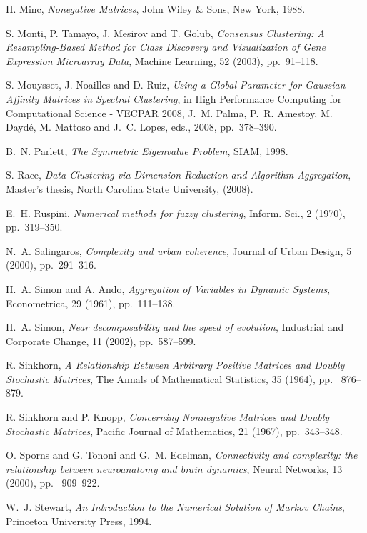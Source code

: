 \documentclass[final]{siamltex}
\begin{document}
\begin{thebibliography}{99}
 {\sc H. Minc}, {\em Nonegative Matrices}, John Wiley \& Sons, New York, 1988.

 {\sc S. Monti, P. Tamayo, J. Mesirov and T. Golub}, {\em Consensus Clustering: A Resampling-Based Method for Class Discovery and Visualization of Gene Expression Microarray Data}, Machine Learning, 52 (2003), pp.~91--118.

 {\sc S. Mouysset, J. Noailles and D. Ruiz}, {\em Using a Global Parameter for Gaussian Affinity Matrices in Spectral Clustering}, in High Performance Computing for Computational Science - VECPAR 2008, J.~M. Palma, P.~R. Amestoy, M. Dayd\'{e}, M. Mattoso and J.~C. Lopes, eds., 2008, pp.~378--390.

 {\sc B.~N. Parlett}, {\em The Symmetric Eigenvalue Problem}, SIAM, 1998.

 {\sc S. Race}, {\em Data Clustering via Dimension Reduction and Algorithm Aggregation}, Master's thesis, North Carolina State University, (2008).

 {\sc E.~H. Ruspini}, {\em Numerical methods for fuzzy clustering}, Inform. Sci., 2 (1970), pp.~319--350. 

 {\sc N.~A. Salingaros}, {\em Complexity and urban coherence}, Journal of Urban Design, 5 (2000), pp.~291--316.

 {\sc H.~A. Simon and A. Ando}, {\em Aggregation of Variables in Dynamic Systems}, Econometrica, 29 (1961), pp.~111--138.

 {\sc H.~A. Simon}, {\em Near decomposability and the speed of evolution}, Industrial and Corporate Change, 11 (2002), pp.~587--599.

 {\sc R. Sinkhorn}, {\em A Relationship Between Arbitrary Positive Matrices and Doubly Stochastic Matrices}, The Annals of Mathematical Statistics, 35 (1964), pp.~ 876--879.

 {\sc R. Sinkhorn and P. Knopp}, {\em Concerning Nonnegative Matrices and Doubly Stochastic Matrices}, Pacific Journal of Mathematics, 21 (1967), pp.~343--348.

 {\sc O. Sporns and G. Tononi and G.~M. Edelman}, {\em Connectivity and complexity: the relationship between neuroanatomy and brain dynamics}, Neural Networks, 13 (2000), pp.~ 909--922.

 {\sc W.~J. Stewart}, {\em An Introduction to the Numerical Solution of Markov Chains}, Princeton University Press, 1994.


\end{thebibliography}
\end{document}
